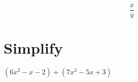 \documentclass[10pt]{article}
\begin{document}
	\begin{equation}
	\frac{x}{y}
	\end{equation}
	\section*{Simplify}
	$(6x^2 -x -2) + (7x^2 -5x +3)$
\end{document}

